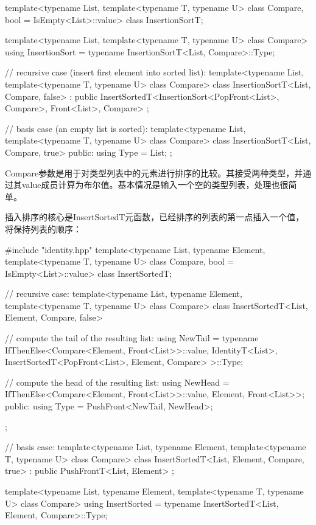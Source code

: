\begin{cpp}
template<typename List,
		template<typename T, typename U> class Compare,
		bool = IsEmpty<List>::value>
class InsertionSortT;

template<typename List,
		template<typename T, typename U> class Compare>
using InsertionSort = typename InsertionSortT<List, Compare>::Type;

// recursive case (insert first element into sorted list):
template<typename List,
		template<typename T, typename U> class Compare>
class InsertionSortT<List, Compare, false>
: public InsertSortedT<InsertionSort<PopFront<List>, Compare>,
						Front<List>, Compare> {};

// basis case (an empty list is sorted):
template<typename List,
		template<typename T, typename U> class Compare>
class InsertionSortT<List, Compare, true> {
	public:
	using Type = List;
};
\end{cpp}

Compare参数是用于对类型列表中的元素进行排序的比较。其接受两种类型，并通过其value成员计算为布尔值。基本情况是输入一个空的类型列表，处理也很简单。

插入排序的核心是InsertSortedT元函数，已经排序的列表的第一点插入一个值，将保持列表的顺序：

\begin{cpp}
#include "identity.hpp"
template<typename List, typename Element,
		template<typename T, typename U> class Compare,
		bool = IsEmpty<List>::value>
class InsertSortedT;

// recursive case:
template<typename List, typename Element,
		template<typename T, typename U> class Compare>
class InsertSortedT<List, Element, Compare, false> {
	// compute the tail of the resulting list:
	using NewTail =
		typename IfThenElse<Compare<Element, Front<List>>::value,
							IdentityT<List>,
							InsertSortedT<PopFront<List>, Element, Compare>
				>::Type;
				
	// compute the head of the resulting list:
	using NewHead = IfThenElse<Compare<Element, Front<List>>::value,
								Element,
								Front<List>>;
	public:
	using Type = PushFront<NewTail, NewHead>;
};

// basis case:
template<typename List, typename Element,
		template<typename T, typename U> class Compare>
class InsertSortedT<List, Element, Compare, true>
: public PushFrontT<List, Element> {};

template<typename List, typename Element,
		template<typename T, typename U> class Compare>
using InsertSorted = typename InsertSortedT<List, Element, Compare>::Type;
\end{cpp}

